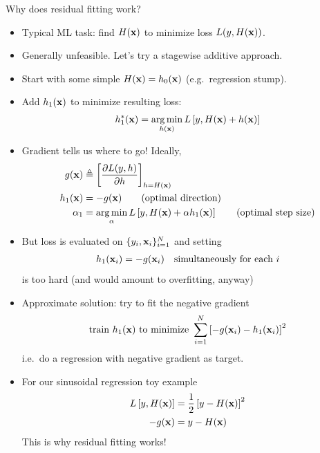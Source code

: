 \documentclass[handout]{beamer}
\begin{document}
\begin{frame}{Why does residual fitting work?}
\begin{itemize}[<+>]
	\item Typical ML task: find $ H(\mathrm{\mathbf{x}}) $ to minimize loss $ L(y, H(\mathrm{\mathbf{x}})) $.
	\item Generally unfeasible. Let's try a stagewise additive approach.
	\item Start with some simple $ H(\mathrm{\mathbf{x}}) = h_0(\mathrm{\mathbf{x}}) $ (e.g.\ regression stump).
	\item Add $ h_1(\mathrm{\mathbf{x}}) $ to minimize resulting loss:
	\begin{gather*}
		h_1^*(\mathrm{\mathbf{x}}) = \operatorname*{arg\,min}_{h(\mathrm{\mathbf{x}})} L\left[
			y, H(\mathrm{\mathbf{x}}) + h(\mathrm{\mathbf{x}})
		\right]
	\end{gather*}
	\item Gradient tells us where to go! Ideally,
	\begin{align*}
		g(\mv x) &\triangleq \left[
			\frac{\partial L(y, h)}{\partial h}
		\right]_{h = H(\mv x)}
		\\
		h_1(\mv x) &= - g(\mv x) 
		\tag{\text{optimal direction}}
		\\
		\alpha_1 &= \argmin_{\alpha} L\left[
			y, H(\mv x) + \alpha h_1(\mv x)
		\right]
		\tag{\text{optimal step size}}
	\end{align*}
\end{itemize}
\end{frame}

\begin{frame}
\begin{itemize}[<+>]
	\item But loss is evaluated on $ \{ y_i, \mathrm{\mathbf{x}}_i \}_{i=1}^N $ and setting
	\begin{gather*}
		h_1(\mathrm{\mathbf{x}}_i) = - g(\mathrm{\mathbf{x}}_i)
		\quad
		\text{simultaneously for each $ i $}
	\end{gather*}
	is too hard (and would amount to overfitting, anyway)

	\item Approximate solution: try to fit the negative gradient
	\begin{gather*}
		\text{train $ h_1(\mathrm{\mathbf{x}}) $ to minimize }
		\sum_{i=1}^{N} \left[
			-g(\mathrm{\mathbf{x}}_i)	- h_1(\mathrm{\mathbf{x}}_i)
		\right]^2
	\end{gather*}
	i.e.\ do a regression with negative gradient as target.
	
	\item For our sinusoidal regression toy example
	\begin{align*}
		L\left[
			y, H(\mathrm{\mathbf{x}})
		\right]
		&= \frac{1}{2} \left[
			y - H(\mathrm{\mathbf{x}})
		\right]^2
		\\
		-g(\mathrm{\mathbf{x}}) &= y - H(\mathrm{\mathbf{x}})
	\end{align*}
	This is why residual fitting works!
\end{itemize}
\end{frame}
\end{document}
